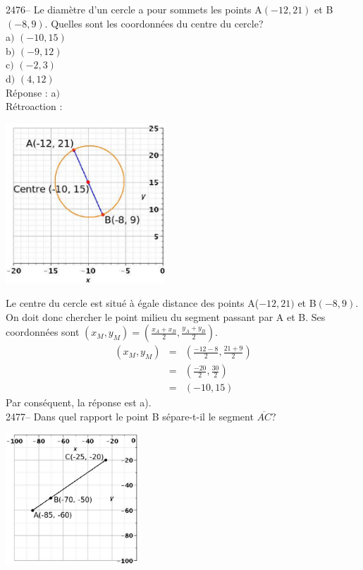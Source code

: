 \documentclass[letterpaper, 12pt]{article}
\begin{document}
2476-- Le diam\`etre d'un cercle a pour sommets les points A$(-12, 21)$ et B$(-8, 9)$. Quelles sont les coordonn\'ees du centre du cercle?\\

a$)$ $(-10, 15)$\\
b$)$ $(-9, 12)$\\
c$)$ $(-2, 3)$\\
d$)$ $(4, 12)$\\

R\'eponse : a$)$\\

R\'etroaction :\\
\begin{center}
 \includegraphics[width=6cm,bb=14 14 415 415]{Q2476r.eps}
\end{center}
Le centre du cercle est situ\'e \`a \'egale distance des points A($-12, 21)$ et B$(-8, 9)$. On doit donc chercher le point milieu du segment passant par A et B. Ses coordonn\'ees sont $(x_{M}, y_{M})=\left( \frac{x_{A}+x_{B}}{2}, \frac{y_{A}+y_{B}}{2}\right) $.
\begin{eqnarray*}
(x_{M}, y_{M})&=& \left( \frac{-12-8}{2}, \frac{21+9}{2}\right) \\[2mm]
&=& \left( \frac{-20}{2}, \frac{30}{2}\right) \\[2mm]
&=& \left( -10, 15\right)
\end{eqnarray*}
Par cons\'equent, la r\'eponse est a).\\

2477-- Dans quel rapport le point B s\'epare-t-il le segment $\overline{AC}$? \\
\begin{center}
 \includegraphics[width=5cm,bb=0 442 400 842]{Q2477.eps}
\end{center}
\end{document}
